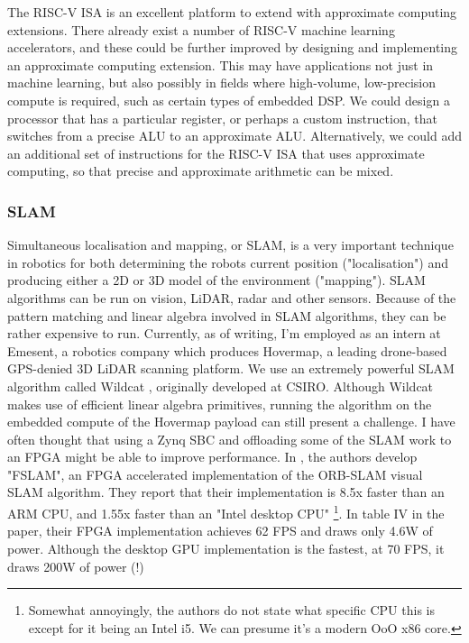 \documentclass[12pt]{article}
\begin{document}
The RISC-V ISA is an excellent platform to extend with approximate computing extensions. There already exist a
number of RISC-V machine learning accelerators, and these could be further improved by designing and
implementing an approximate computing extension. This may have applications not just in machine learning, but
also possibly in fields where high-volume, low-precision compute is required, such as certain types of 
embedded DSP. We could design a processor that has a particular register, or perhaps a custom instruction,
that switches from a precise ALU to an approximate ALU. Alternatively, we could add an additional set of
instructions for the RISC-V ISA that uses approximate computing, so that precise and approximate arithmetic
can be mixed.

\subsubsection{SLAM}

Simultaneous localisation and mapping, or SLAM, is a very important technique in robotics for both determining
the robots current position ("localisation") and producing either a 2D or 3D model of the environment
("mapping"). SLAM algorithms can be run on vision, LiDAR, radar and other sensors. Because of the pattern
matching and linear algebra involved in SLAM algorithms, they can be rather expensive to run. Currently, as of
writing, I'm employed as an intern at Emesent, a robotics company which produces Hovermap, a leading drone-based
GPS-denied 3D LiDAR scanning platform. We use an extremely powerful SLAM algorithm called Wildcat \cite{ramezani2022wildcat}, 
originally developed at CSIRO. Although Wildcat makes use of efficient linear algebra
primitives, running the algorithm on the embedded compute of the Hovermap payload can still present a
challenge. I have often thought that using a Zynq SBC and offloading some of the SLAM work to an FPGA might be
able to improve performance. In \cite{Vemulapati2022}, the authors develop "FSLAM", an FPGA accelerated
implementation of the ORB-SLAM visual SLAM algorithm. They report that their implementation is 8.5x faster
than an ARM CPU, and 1.55x faster than an "Intel desktop CPU" \footnote{Somewhat annoyingly, the authors do
not state what specific CPU this is except for it being an Intel i5. We can presume it's a modern OoO x86
core.}. In table IV in the paper, their FPGA implementation achieves 62 FPS and draws only 4.6W of power.
Although the desktop GPU implementation is the fastest, at 70 FPS, it draws 200W of power (!)
\end{document}
